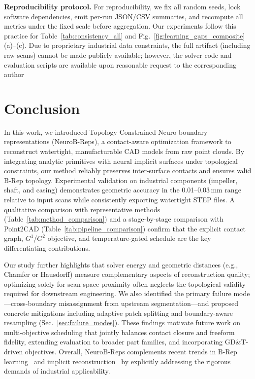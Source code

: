 \documentclass{ieeeaccess}
\begin{document}
\textbf{Reproducibility protocol.} For reproducibility, we fix all random seeds, lock software dependencies, 
emit per-run JSON/CSV summaries, and recompute all metrics under the fixed scale before aggregation. 
Our experiments follow this practice for Table~\ref{tab:consistency_all} and Fig.~\ref{fig:learning_gaps_composite}(a)--(c). 
Due to proprietary industrial data constraints, the full artifact (including raw scans) cannot be made publicly available; 
however, the solver code and evaluation scripts are available upon reasonable request to the corresponding author


\section{Conclusion}
\label{sec:conclusion}
In this work, we introduced Topology-Constrained Neuro boundary representations (NeuroB-Reps), a contact-aware optimization framework to reconstruct watertight, manufacturable CAD models from raw point clouds. By integrating analytic primitives with neural implicit surfaces under topological constraints, our method reliably preserves inter-surface contacts and ensures valid B-Rep topology. Experimental validation on industrial components (impeller, shaft, and casing) demonstrates geometric accuracy in the 0.01--0.03\,mm range relative to input scans while consistently exporting watertight STEP files. A qualitative comparison with representative methods (Table~\ref{tab:method_comparison}) and a stage-by-stage comparison with Point2CAD (Table~\ref{tab:pipeline_comparison}) confirm that the explicit contact graph, $G^1$/$G^2$ objective, and temperature-gated schedule are the key differentiating contributions.

Our study further highlights that solver energy and geometric distances (e.g., Chamfer or Hausdorff) measure complementary aspects of reconstruction quality; optimizing solely for scan-space proximity often neglects the topological validity required for downstream engineering. We also identified the primary failure mode---cross-boundary misassignment from upstream segmentation---and proposed concrete mitigations including adaptive patch splitting and boundary-aware resampling (Sec.~\ref{sec:failure_modes}). These findings motivate future work on multi-objective scheduling that jointly balances contact closure and freeform fidelity, extending evaluation to broader part families, and incorporating GD\&T-driven objectives. Overall, NeuroB-Reps complements recent trends in B-Rep learning~\cite{b3,b1,b4,b20} and implicit reconstruction~\cite{b5,b6,b17,b21} by explicitly addressing the rigorous demands of industrial applicability.
\end{document}

